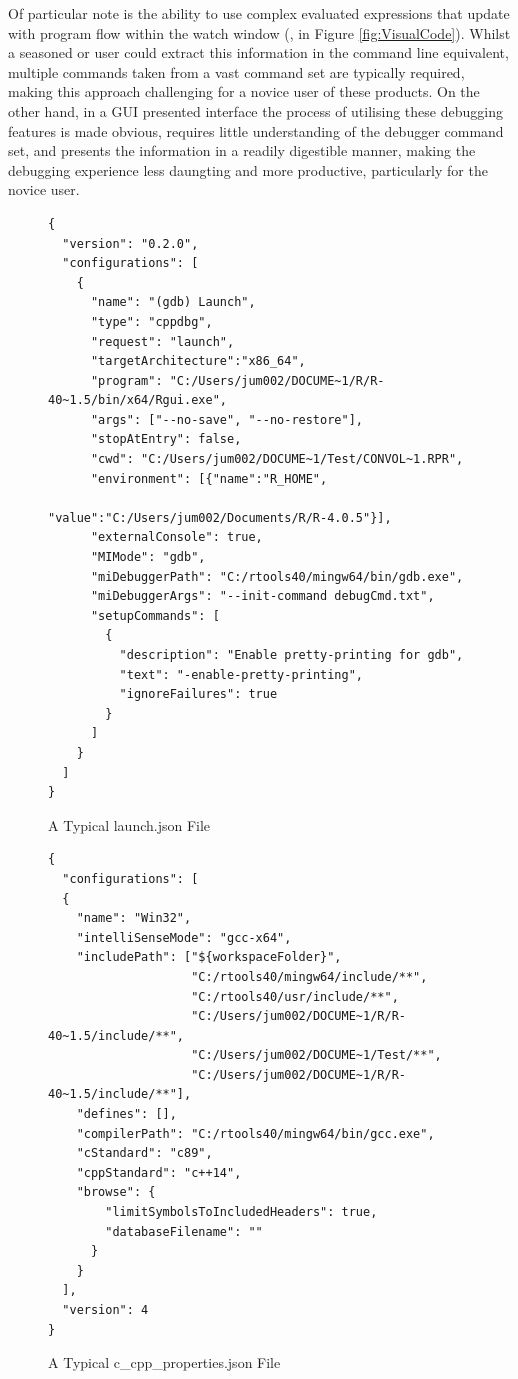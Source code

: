 Of particular note is the ability to use complex evaluated expressions that update with program flow within the watch window (,  in Figure \ref{fig:VisualCode}). 
Whilst a seasoned  or  user could extract this information in the command line equivalent, multiple commands taken from a vast command set are typically required,
making this approach challenging for a novice user of these products. On the other hand, in a GUI presented interface the process of utilising these debugging features is made obvious, 
requires little understanding of the debugger command set, and presents the information in a readily digestible manner, making the debugging experience less daungting and more productive, 
particularly for the novice user. 

\begin{Schunk}
\begin{figure}[htbp]
{\centering}
\begin{verbatim}
{
  "version": "0.2.0",
  "configurations": [
    {
      "name": "(gdb) Launch",
      "type": "cppdbg",
      "request": "launch",
      "targetArchitecture":"x86_64",
      "program": "C:/Users/jum002/DOCUME~1/R/R-40~1.5/bin/x64/Rgui.exe",
      "args": ["--no-save", "--no-restore"],
      "stopAtEntry": false,
      "cwd": "C:/Users/jum002/DOCUME~1/Test/CONVOL~1.RPR",
      "environment": [{"name":"R_HOME",
                       "value":"C:/Users/jum002/Documents/R/R-4.0.5"}],
      "externalConsole": true,
      "MIMode": "gdb",
      "miDebuggerPath": "C:/rtools40/mingw64/bin/gdb.exe",
      "miDebuggerArgs": "--init-command debugCmd.txt",
      "setupCommands": [
        {
          "description": "Enable pretty-printing for gdb",
          "text": "-enable-pretty-printing",
          "ignoreFailures": true
        }
      ]
    }
  ]
}
\end{verbatim}
\caption[A Typical launch.json File]{A Typical launch.json File}
\label{fig:launchJSON}
\end{figure}
\end{Schunk}
  
\begin{Schunk}
\begin{figure}[htbp]
{\centering}
\begin{verbatim}
{
  "configurations": [
  {
    "name": "Win32",
    "intelliSenseMode": "gcc-x64",
    "includePath": ["${workspaceFolder}",
                    "C:/rtools40/mingw64/include/**",
                    "C:/rtools40/usr/include/**",
                    "C:/Users/jum002/DOCUME~1/R/R-40~1.5/include/**",
                    "C:/Users/jum002/DOCUME~1/Test/**",
                    "C:/Users/jum002/DOCUME~1/R/R-40~1.5/include/**"],
    "defines": [],
    "compilerPath": "C:/rtools40/mingw64/bin/gcc.exe",
    "cStandard": "c89",
    "cppStandard": "c++14",
    "browse": {
        "limitSymbolsToIncludedHeaders": true,
        "databaseFilename": ""
      }
    }
  ],
  "version": 4
}
\end{verbatim}
\caption[A Typical c\_cpp\_properties.json File]{A Typical c\_cpp\_properties.json File}
\label{fig:CnCppProp}
\end{figure}
\end{Schunk}
  
